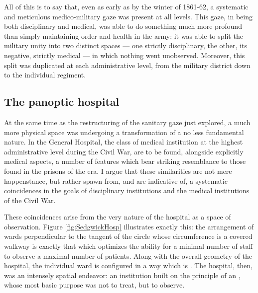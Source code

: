 \documentclass[12pt]{article}
\begin{document}
All of this is to say that, even as early as by the winter of 1861-62, a systematic and meticulous medico-military gaze was present at all levels.
This gaze, in being both disciplinary and medical, was able to do something much more profound than simply maintaining order and health in the army: it was
able to split the military unity into two distinct spaces --- one strictly disciplinary, the other, its negative, strictly medical --- in which nothing
went unobserved. Moreover, this split was duplicated at each administrative level, from the military district down to the individual regiment.

\subsection{The panoptic hospital}
At the same time as the restructuring of the sanitary gaze just explored, a much more physical space was undergoing a transformation of a no less
fundamental nature. In the General Hospital, the class of medical institution at the highest administrative level during the Civil War, are to be found,
alongside explicitly medical aspects, a number of features which bear striking resemblance to those found in the prisons of the era. I argue that these
similarities are not mere happenstance, but rather spawn from, and are indicative of, a systematic coincidences in the goals of disciplinary institutions and the
medical institutions of the Civil War.

These coincidences arise from the very nature of the hospital as a space of observation. Figure \ref{fig:SedgwickHosp} illustrates exactly
this: the arrangement of wards perpendicular to the tangent of the circle whose circumference is a covered walkway is exactly that which optimizes the ability
for a minimal number of staff to observe a maximal number of patients. Along with the overall geometry of the hospital, the individual ward is configured
in a way which is .\autocite[919]{MedHist_1-3}
The hospital, then, was an intensely spatial endeavor: an institution built on the principle of an , whose most basic purpose
was not to treat, but to observe.\autocite[935]{MedHist_1-3}
\end{document}

